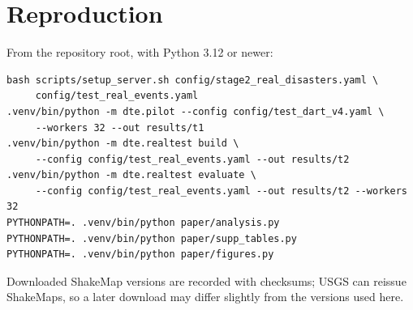 \documentclass[12pt]{article}
\begin{document}
\begin{table}[h]
\centering
\caption{Test 2 secondary analyses. Event-clustered: each real event averaged over the networks it hit. Stricter thresholds: 64-kt winds and MMI VIII.}
\label{tab:s4b}
\resizebox{\linewidth}{!}{}
\end{table}

\begin{table}[h]
\centering
\caption{Test 2 mean routable loss (\% of demand) per network at the primary thresholds.}
\label{tab:s4c}

\end{table}

\begin{table}[h]
\centering
\caption{All one- and two-link cuts on the Test 1 networks (1{,}596, 2{,}485 and 1{,}711 cuts): 95th percentile / worst routable loss (\% of demand), $k=4$.}
\label{tab:s4a}

\end{table}

\begin{table}[h]
\centering
\caption{Real test earthquakes (2018--2025) that failed at least one element. No rule lost routable traffic in any of them.}
\label{tab:s5}

\end{table}

\section{Reproduction}
\label{sec:s5}
From the repository root, with Python 3.12 or newer:
\begin{verbatim}
bash scripts/setup_server.sh config/stage2_real_disasters.yaml \
     config/test_real_events.yaml
.venv/bin/python -m dte.pilot --config config/test_dart_v4.yaml \
     --workers 32 --out results/t1
.venv/bin/python -m dte.realtest build \
     --config config/test_real_events.yaml --out results/t2
.venv/bin/python -m dte.realtest evaluate \
     --config config/test_real_events.yaml --out results/t2 --workers 32
PYTHONPATH=. .venv/bin/python paper/analysis.py
PYTHONPATH=. .venv/bin/python paper/supp_tables.py
PYTHONPATH=. .venv/bin/python paper/figures.py
\end{verbatim}
Downloaded ShakeMap versions are recorded with checksums; USGS can reissue ShakeMaps, so a later download may differ slightly from the versions used here.
\end{document}
